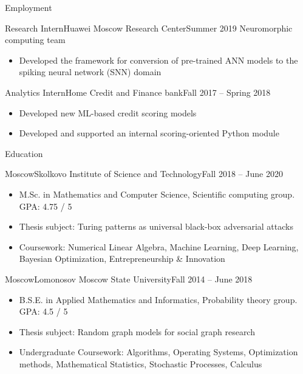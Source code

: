 \documentclass[]{mcdowellcv}
\begin{document}
	\makeheader
	
	\begin{cvsection}{Employment}
		\begin{cvsubsection}{Research Intern}{Huawei Moscow Research Center}{Summer 2019}
			Neuromorphic computing team			
			\begin{itemize}
			    \item Developed the framework for conversion of pre-trained ANN models to the spiking neural network (SNN) domain
			\end{itemize}
		\end{cvsubsection}
		
		\begin{cvsubsection}{Analytics Intern}{Home Credit and Finance bank}{Fall 2017 -- Spring 2018}	
			\begin{itemize}
				\item Developed new ML-based credit scoring models
				\item Developed and supported an internal scoring-oriented Python module
			\end{itemize}
		\end{cvsubsection}
		
	\end{cvsection}
	
	\begin{cvsection}{Education}
		\begin{cvsubsection}{Moscow}{Skolkovo Institute of Science and Technology}{Fall 2018 -- June 2020}
			\begin{itemize}
				\item M.Sc. in Mathematics and Computer Science, Scientific computing group. GPA: 4.75 / 5
				\item Thesis subject: Turing patterns as universal black-box adversarial attacks
				\item Coursework: Numerical Linear Algebra, Machine Learning, Deep Learning, Bayesian Optimization, Entrepreneurship \& Innovation
			\end{itemize}
		\end{cvsubsection}
		\begin{cvsubsection}{Moscow}{Lomonosov Moscow State University}{Fall 2014 -- June 2018}
			\begin{itemize}
				\item B.S.E. in Applied Mathematics and Informatics, Probability theory group. GPA: 4.5 / 5
				\item Thesis subject: Random graph models for social graph research
				\item Undergraduate Coursework: Algorithms, Operating Systems, Optimization methods, Mathematical Statistics, Stochastic Processes, Calculus
			\end{itemize}
		\end{cvsubsection}
	\end{cvsection}
	
\end{document}

